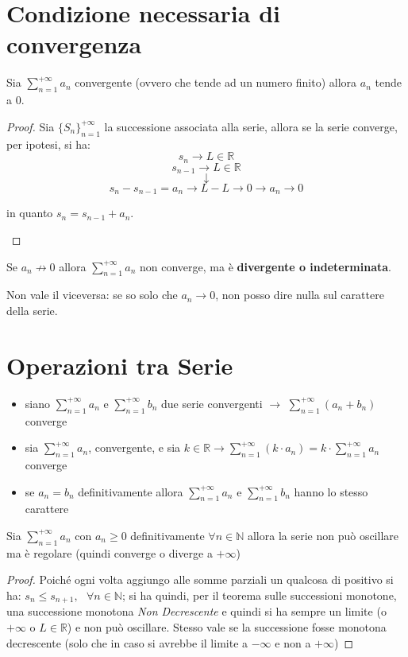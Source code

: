 \documentclass[a4paper,12pt, oneside]{book}
\begin{document}
\section{Condizione necessaria di convergenza}
\begin{teorema}
Sia $\sum_{n=1}^{+\infty} a_n$ convergente (ovvero che tende ad un numero finito) allora $a_n$  tende a $0$.
\end{teorema}
\begin{proof}
Sia ${\{S_n\}}_{n=1}^{+\infty}$ la successione associata alla serie, allora se la serie converge, per ipotesi, si ha:
$$s_n \rightarrow L\in \mathbb{R}$$
$$s_{n-1} \rightarrow L\in \mathbb{R}$$
$$\downarrow$$
$$s_n-s_{n-1}=a_n\rightarrow L-L\rightarrow 0 \longrightarrow a_n \rightarrow 0$$
\begin{center}in quanto $s_n=s_{n-1}+a_n$.\end{center} 
\end{proof}
\begin{nota}
Se $a_n\not\rightarrow 0$ allora $\sum_{n=1}^{+\infty} a_n$  non converge, ma è \textbf{divergente o indeterminata}.
\end{nota}
\begin{nota}
Non vale il viceversa: se so solo che $a_n\rightarrow 0$, non posso dire nulla sul carattere della serie.
\end{nota}


\section{Operazioni tra Serie}
\begin{itemize}
\item siano $\sum_{n=1}^{+\infty} a_n$ e $\sum_{n=1}^{+\infty} b_n$ due serie convergenti $\longrightarrow$ $\sum_{n=1}^{+\infty} (a_n+b_n)$ converge
\item sia $\sum_{n=1}^{+\infty} a_n$, convergente, e sia $k\in \mathbb{R} \longrightarrow \sum_{n=1}^{+\infty} (k\cdot a_n)=k\cdot \sum_{n=1}^{+\infty} a_n$ converge
\item se $a_n=b_n$ definitivamente allora $\sum_{n=1}^{+\infty} a_n$ e $\sum_{n=1}^{+\infty} b_n$ hanno lo stesso carattere
\end{itemize}

\begin{teorema}
Sia $\sum_{n=1}^{+\infty} a_n$ con $a_n\geq 0$ definitivamente $\forall n\in \mathbb{N}$ allora la serie non può oscillare ma è regolare (quindi converge o diverge a $+\infty$)
\end{teorema}
\begin{proof}
Poiché ogni volta aggiungo alle somme parziali un qualcosa di positivo si ha: $s_n\leq s_{n+1},\mbox{ } \forall n\in \mathbb{N}$; si ha quindi, per il teorema sulle successioni monotone, una successione monotona \textit{Non Decrescente} e quindi si ha sempre un limite (o $+\infty$ o $L\in \mathbb{R}$) e non può oscillare. Stesso vale se la successione fosse monotona decrescente (solo che in caso si avrebbe il limite a $-\infty$ e non a $+\infty$)
\end{proof}
\end{document}
